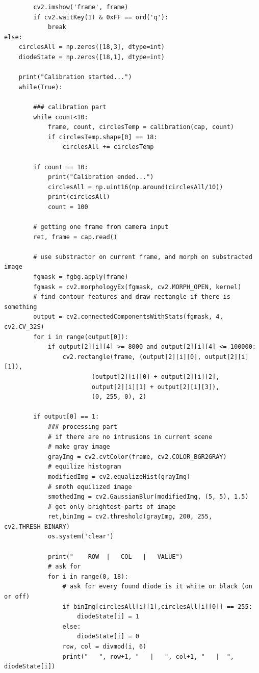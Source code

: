 \documentclass[a4paper,12pt, projekat]{etf}
\begin{document}
\begin{verbatim}
        cv2.imshow('frame', frame)
        if cv2.waitKey(1) & 0xFF == ord('q'):
            break
else:
    circlesAll = np.zeros([18,3], dtype=int)
    diodeState = np.zeros([18,1], dtype=int)

    print("Calibration started...")
    while(True):

        ### calibration part
        while count<10:
            frame, count, circlesTemp = calibration(cap, count)
            if circlesTemp.shape[0] == 18:
                circlesAll += circlesTemp

        if count == 10:
            print("Calibration ended...")
            circlesAll = np.uint16(np.around(circlesAll/10))
            print(circlesAll)
            count = 100

        # getting one frame from camera input
        ret, frame = cap.read()

        # use substractor on current frame, and morph on substracted image
        fgmask = fgbg.apply(frame)
        fgmask = cv2.morphologyEx(fgmask, cv2.MORPH_OPEN, kernel)
        # find contour features and draw rectangle if there is something
        output = cv2.connectedComponentsWithStats(fgmask, 4, cv2.CV_32S)
        for i in range(output[0]):
            if output[2][i][4] >= 8000 and output[2][i][4] <= 100000:
                cv2.rectangle(frame, (output[2][i][0], output[2][i][1]),
                        (output[2][i][0] + output[2][i][2],
                        output[2][i][1] + output[2][i][3]),
                        (0, 255, 0), 2)

        if output[0] == 1:
            ### processing part
            # if there are no intrusions in current scene
            # make gray image
            grayImg = cv2.cvtColor(frame, cv2.COLOR_BGR2GRAY)
            # equilize histogram
            modifiedImg = cv2.equalizeHist(grayImg)
            # smoth equilized image
            smothedImg = cv2.GaussianBlur(modifiedImg, (5, 5), 1.5)
            # get only brightest parts of image
            ret,binImg = cv2.threshold(grayImg, 200, 255, cv2.THRESH_BINARY)
            os.system('clear')

            print("    ROW  |   COL   |   VALUE")
            # ask for
            for i in range(0, 18):
                # ask for every found diode is it white or black (on or off)
                if binImg[circlesAll[i][1],circlesAll[i][0]] == 255:
                    diodeState[i] = 1
                else:
                    diodeState[i] = 0
                row, col = divmod(i, 6)
                print("   ", row+1, "   |   ", col+1, "   |  ", diodeState[i])


\end{verbatim}
\end{document}
